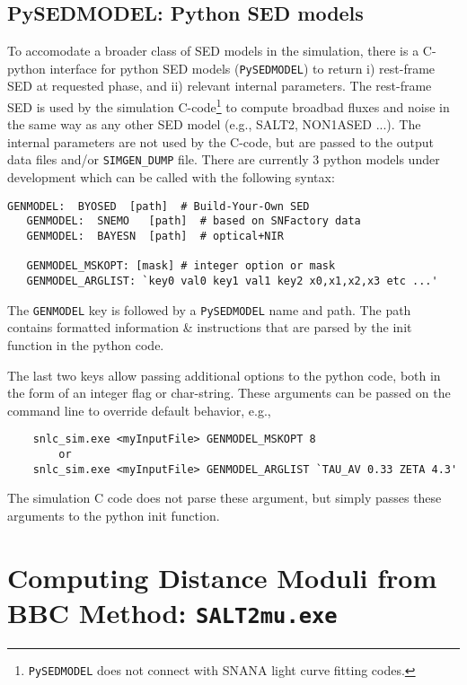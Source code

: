 \documentclass[12pt]{article}
\begin{document}
\clearpage
\subsection{PySEDMODEL: Python SED models}
\label{subsec:PySEDMODEL}

To accomodate a broader class of SED models in the simulation,
there is a C-python interface for python SED models ({\tt PySEDMODEL}) 
to return
i) rest-frame SED at requested phase, and 
ii) relevant internal parameters.
The rest-frame SED is used by the simulation C-code\footnote{{\tt PySEDMODEL}
  does not connect with SNANA light curve fitting codes.}
to compute broadbad fluxes and noise in the same way as
any other SED model (e.g., SALT2, NON1ASED ...). 
The internal parameters are not used by the C-code, 
but are passed to the output data files and/or {\tt SIMGEN\_DUMP} file.
There are currently 3 python models under development which
can be called with the following syntax:
%
\begin{Verbatim}[frame=single]
   GENMODEL:  BYOSED  [path]  # Build-Your-Own SED
   GENMODEL:  SNEMO   [path]  # based on SNFactory data
   GENMODEL:  BAYESN  [path]  # optical+NIR

   GENMODEL_MSKOPT: [mask] # integer option or mask
   GENMODEL_ARGLIST: `key0 val0 key1 val1 key2 x0,x1,x2,x3 etc ...'
\end{Verbatim}

The {\tt GENMODEL} key is followed by a {\tt PySEDMODEL} name
and path. The path contains formatted information \& instructions 
that are parsed by the init function in the python code.

The last two keys allow passing additional options to the
python code, both in the form of an integer flag or char-string.
These arguments can be passed on the command line to override
default behavior, e.g.,
%
\begin{verbatim}
    snlc_sim.exe <myInputFile> GENMODEL_MSKOPT 8
        or
    snlc_sim.exe <myInputFile> GENMODEL_ARGLIST `TAU_AV 0.33 ZETA 4.3'
\end{verbatim}
The simulation C code does not parse these argument, but simply
passes these arguments to the python init function.



   \clearpage
   \section{Computing Distance Moduli from BBC Method: {\tt SALT2mu.exe} }
   \label{sec:SALT2mu}
\end{document}
